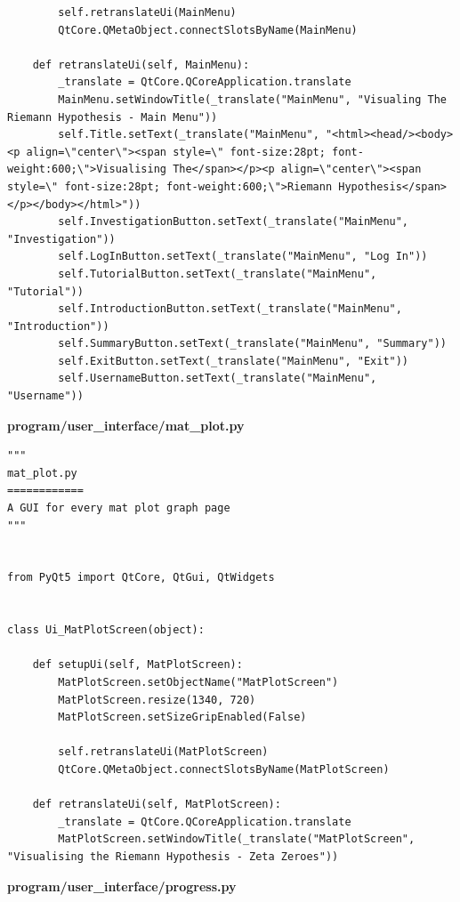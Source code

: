 \documentclass{article}
\begin{document}
\begin{lstlisting}
        self.retranslateUi(MainMenu)
        QtCore.QMetaObject.connectSlotsByName(MainMenu)

    def retranslateUi(self, MainMenu):
        _translate = QtCore.QCoreApplication.translate
        MainMenu.setWindowTitle(_translate("MainMenu", "Visualing The Riemann Hypothesis - Main Menu"))
        self.Title.setText(_translate("MainMenu", "<html><head/><body><p align=\"center\"><span style=\" font-size:28pt; font-weight:600;\">Visualising The</span></p><p align=\"center\"><span style=\" font-size:28pt; font-weight:600;\">Riemann Hypothesis</span></p></body></html>"))
        self.InvestigationButton.setText(_translate("MainMenu", "Investigation"))
        self.LogInButton.setText(_translate("MainMenu", "Log In"))
        self.TutorialButton.setText(_translate("MainMenu", "Tutorial"))
        self.IntroductionButton.setText(_translate("MainMenu", "Introduction"))
        self.SummaryButton.setText(_translate("MainMenu", "Summary"))
        self.ExitButton.setText(_translate("MainMenu", "Exit"))
        self.UsernameButton.setText(_translate("MainMenu", "Username"))
\end{lstlisting}


\textbf{program/user\_interface/mat\_plot.py}

\begin{lstlisting}
"""
mat_plot.py
============
A GUI for every mat plot graph page
"""


from PyQt5 import QtCore, QtGui, QtWidgets


class Ui_MatPlotScreen(object):

    def setupUi(self, MatPlotScreen):
        MatPlotScreen.setObjectName("MatPlotScreen")
        MatPlotScreen.resize(1340, 720)
        MatPlotScreen.setSizeGripEnabled(False)

        self.retranslateUi(MatPlotScreen)
        QtCore.QMetaObject.connectSlotsByName(MatPlotScreen)

    def retranslateUi(self, MatPlotScreen):
        _translate = QtCore.QCoreApplication.translate
        MatPlotScreen.setWindowTitle(_translate("MatPlotScreen", "Visualising the Riemann Hypothesis - Zeta Zeroes"))
\end{lstlisting}


\textbf{program/user\_interface/progress.py}
\end{document}
